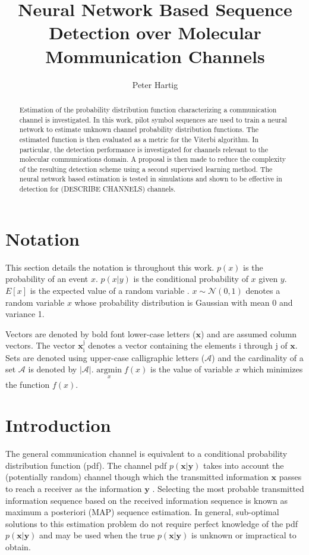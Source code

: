 \documentclass[12pt,a4paper]{report}
\title{Neural Network Based Sequence Detection over Molecular Mommunication Channels}
\author{Peter Hartig}
\begin{document}
\maketitle

\begin{abstract}
Estimation of the probability distribution function characterizing a communication channel is investigated. In this work, pilot symbol sequences are used to train a neural network to estimate unknown channel probability distribution functions. The estimated function is then evaluated as a metric for the Viterbi algorithm. In particular, the detection performance is investigated for channels relevant to the molecular communications domain. A proposal is then made to reduce the complexity of the resulting detection scheme using a second supervised learning method. The neural network based estimation is tested in simulations and shown to be effective in detection for (DESCRIBE CHANNELS) channels. 
\end{abstract}

\newpage
\tableofcontents
\newpage
\section{Notation}
This section details the notation is throughout this work.
$p(x)$ is the probability of an event $x$.
$p(x|y)$ is the conditional probability of $x$ given $y$.
$E[x]$ is the expected value of a random variable .
$x \sim \mathcal{N}(0,1)$ denotes a random variable $x$ whose probability distribution is Gaussian with mean 0 and variance 1. 

Vectors are denoted by bold font lower-case letters ($\mathbf{x}$) and are assumed column vectors.
The vector $\mathbf{x}_{\mathrm{i}}^{\mathrm{j}}$ denotes a vector containing the elements i through j of $\mathbf{x}$. Sets are denoted using upper-case calligraphic letters ($\mathcal{A}$) and the cardinality of a set $\mathcal{A}$ is denoted by $|\mathcal{A}|$.
$\underset{x}{\text{argmin}} \; f(x)$ is the value of variable $x$ which minimizes the function $f(x)$.

\section{Introduction}

The general communication channel is equivalent to a conditional probability distribution function (pdf). The channel pdf $p(\mathbf{x}|\mathbf{y})$ takes into account the (potentially random) channel though which the transmitted information $\mathbf{x}$ passes to reach a receiver as the information $\mathbf{y}$ \cite[Ch.~7]{cover2012elements}. Selecting the most probable transmitted information sequence based on the received information sequence is known as maximum a posteriori (MAP) sequence estimation. In general, sub-optimal solutions to this estimation problem do not require perfect knowledge of the pdf $p(\mathbf{x}|\mathbf{y})$ and may be used when the true $p(\mathbf{x}|\mathbf{y})$ is unknown or impractical to obtain.
\end{document}
